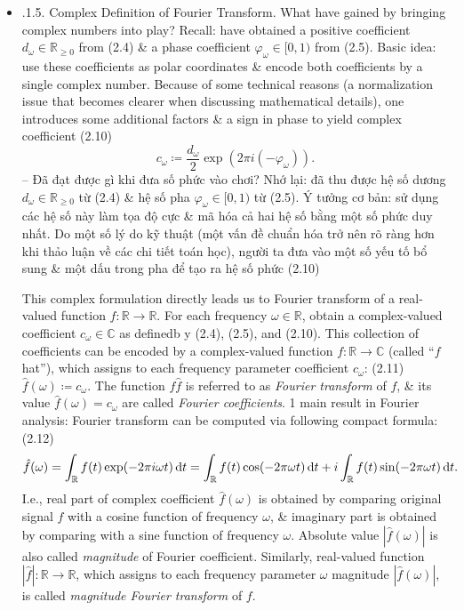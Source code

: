 \documentclass{article}
\begin{document}
\begin{itemize}
\begin{itemize}
\begin{itemize}
\begin{itemize}
				\item {.1.5. Complex Definition of Fourier Transform.} What have gained by bringing complex numbers into play? Recall: have obtained a positive coefficient $d_\omega\in\mathbb{R}_{\ge0}$ from (2.4) \& a phase coefficient $\varphi_\omega\in[0,1)$ from (2.5). Basic idea: use these coefficients as polar coordinates \& encode both coefficients by a single complex number. Because of some technical reasons (a normalization issue that becomes clearer when discussing mathematical details), one introduces some additional factors \& a sign in phase to yield complex coefficient (2.10)
				\begin{equation*}
					c_\omega\coloneqq\dfrac{d_\omega}{2}\exp(2\pi i(-\varphi_\omega)).
				\end{equation*}
				-- Đã đạt được gì khi đưa số phức vào chơi? Nhớ lại: đã thu được hệ số dương $d_\omega\in\mathbb{R}_{\ge0}$ từ (2.4) \& hệ số pha $\varphi_\omega\in[0,1)$ từ (2.5). Ý tưởng cơ bản: sử dụng các hệ số này làm tọa độ cực \& mã hóa cả hai hệ số bằng một số phức duy nhất. Do một số lý do kỹ thuật (một vấn đề chuẩn hóa trở nên rõ ràng hơn khi thảo luận về các chi tiết toán học), người ta đưa vào một số yếu tố bổ sung \& một dấu trong pha để tạo ra hệ số phức (2.10)
				
				This complex formulation directly leads us to Fourier transform of a real-valued function $f:\mathbb{R}\to\mathbb{R}$. For each frequency $\omega\in\mathbb{R}$, obtain a complex-valued coefficient $c_\omega\in\mathbb{C}$ as definedb y (2.4), (2.5), and (2.10). This collection of coefficients can be encoded by a complex-valued function $f:\mathbb{R}\to\mathbb{C}$ (called ``$f$ hat''), which assigns to each frequency parameter coefficient $c_\omega$: (2.11) $\hat{f}(\omega)\coloneqq c_\omega$. The function $f\hat{f}$ is referred to as {\it Fourier transform} of $f$, \& its value $\hat{f}(\omega) = c_\omega$ are called {\it Fourier coefficients}. 1 main result in Fourier analysis: Fourier transform can be computed via following compact formula: (2.12)
				\begin{equation*}
					\hat{f}(\omega) = \int_\mathbb{R} f(t)\exp(-2\pi i\omega t)\,{\rm d}t = \int_\mathbb{R} f(t)\cos(-2\pi\omega t)\,{\rm d}t + i\int_\mathbb{R} f(t)\sin(-2\pi\omega t)\,{\rm d}t.
				\end{equation*}
				I.e., real part of complex coefficient $\hat{f}(\omega)$ is obtained by comparing original signal $f$ with a cosine function of frequency $\omega$, \& imaginary part is obtained by comparing with a sine function of frequency $\omega$. Absolute value $|\hat{f}(\omega)|$ is also called {\it magnitude} of Fourier coefficient. Similarly, real-valued function $|\hat{f}|:\mathbb{R}\to\mathbb{R}$, which assigns to each frequency parameter $\omega$ magnitude $|\hat{f}(\omega)|$, is called {\it magnitude Fourier transform} of $f$.
				

\end{itemize}
\end{itemize}
\end{itemize}
\end{itemize}
\end{document}
